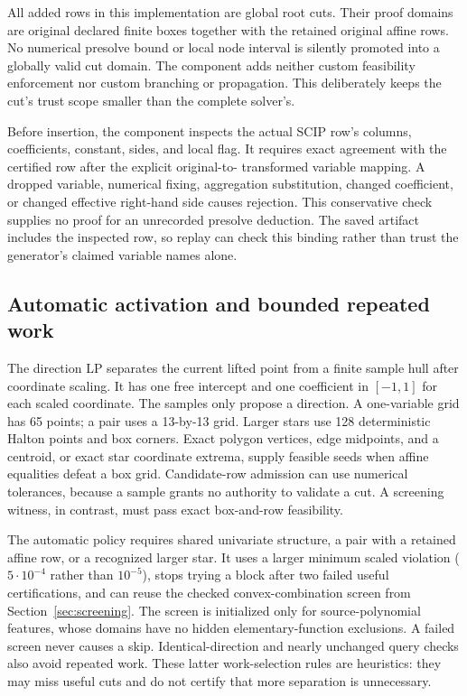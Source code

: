All added rows in this implementation are global root cuts. Their
proof domains are original declared finite boxes together with the
retained original affine rows. No numerical presolve bound or local
node interval is silently promoted into a globally valid cut domain.
The component adds neither custom feasibility enforcement nor custom
branching or propagation. This deliberately keeps the cut's trust
scope smaller than the complete solver's.

Before insertion, the component inspects the actual SCIP row's
columns, coefficients, constant, sides, and local flag. It requires
exact agreement with the certified row after the explicit original-to-
transformed variable mapping. A dropped variable, numerical fixing,
aggregation substitution, changed coefficient, or changed effective
right-hand side causes rejection. This conservative check supplies no
proof for an unrecorded presolve deduction. The saved artifact includes
the inspected row, so replay can check this binding rather than trust
the generator's claimed variable names alone.

\subsection{Automatic activation and bounded repeated work}

The direction LP separates the current lifted point from a finite
sample hull after coordinate scaling. It has one free intercept and
one coefficient in $[-1,1]$ for each scaled coordinate. The samples
only propose a direction. A one-variable grid has 65 points; a pair
uses a 13-by-13 grid. Larger stars use 128 deterministic Halton points
and box corners. Exact polygon vertices, edge midpoints, and a centroid,
or exact star coordinate extrema, supply feasible seeds when affine
equalities defeat a box grid. Candidate-row admission can use numerical tolerances,
because a sample grants no authority to validate a cut. A screening
witness, in contrast, must pass exact box-and-row feasibility.

The automatic policy requires shared univariate structure, a pair
with a retained affine row, or a recognized larger star. It uses a larger minimum scaled
violation ($5\cdot10^{-4}$ rather than $10^{-5}$), stops trying a block
after two failed useful certifications, and can reuse the checked
convex-combination screen from Section~\ref{sec:screening}. The
screen is initialized only for source-polynomial features, whose
domains have no hidden elementary-function exclusions. A failed
screen never causes a skip. Identical-direction and nearly unchanged
query checks also avoid repeated work. These latter work-selection
rules are heuristics: they may miss useful cuts and do not certify
that more separation is unnecessary.

